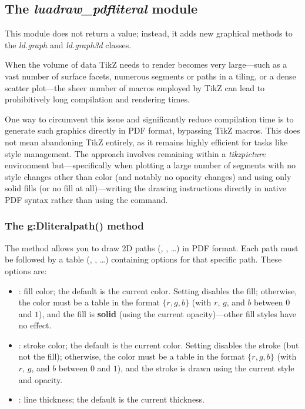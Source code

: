 \subsection{The \emph{luadraw\_pdfliteral} module}

This module does not return a value; instead, it adds new graphical methods to the \emph{ld.graph} and \emph{ld.graph3d} classes.

When the volume of data TikZ needs to render becomes very large—such as a vast number of surface facets, numerous segments or paths in a tiling, or a dense scatter plot—the sheer number of macros employed by TikZ can lead to prohibitively long compilation and rendering times.

One way to circumvent this issue and significantly reduce compilation time is to generate such graphics directly in PDF format, bypassing TikZ macros. This does not mean abandoning TikZ entirely, as it remains highly efficient for tasks like style management. The approach involves remaining within a \emph{tikzpicture} environment but—specifically when plotting a large number of segments with no style changes other than color (and notably no opacity changes) and using only solid fills (or no fill at all)—writing the drawing instructions directly in native PDF syntax rather than using the \drawcmd command.


\subsubsection{The g:Dliteralpath() method}

The  method allows you to draw 2D paths (, , \ldots) in PDF format. Each path must be followed by a table (, , \ldots) containing options for that specific path. These options are:
\begin{itemize}
    \item {}: fill color; the default is the current color. Setting  disables the fill; otherwise, the color must be a table in the format $\{r,g,b\}$ (with $r$, $g$, and $b$ between $0$ and $1$), and the fill is \textbf{solid} (using the current opacity)—other fill styles have no effect. 

    \item {}: stroke color; the default is the current color. Setting  disables the stroke (but not the fill); otherwise, the color must be a table in the format $\{r,g,b\}$ (with $r$, $g$, and $b$ between $0$ and $1$), and the stroke is drawn using the current style and opacity. 

    \item {}: line thickness; the default is the current thickness. 
\end{itemize}

